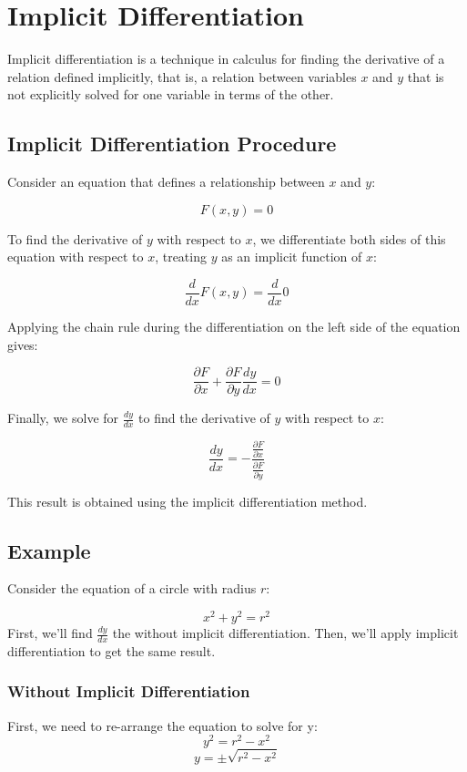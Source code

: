 \chapter{Implicit Differentiation}

Implicit differentiation is a technique in calculus for finding the
derivative of a relation defined implicitly, that is, a relation
between variables $x$ and $y$ that is not explicitly solved for one
variable in terms of the other.

\section{Implicit Differentiation Procedure}

Consider an equation that defines a relationship between $x$ and $y$:

\[
F(x, y) = 0
\]

To find the derivative of $y$ with respect to $x$, we differentiate
both sides of this equation with respect to $x$, treating $y$ as an
implicit function of $x$:

\[
\frac{d}{dx} F(x, y) = \frac{d}{dx} 0
\]

Applying the chain rule during the differentiation on the left side of
the equation gives:

\[
\frac{\partial F}{\partial x} + \frac{\partial F}{\partial y} \frac{dy}{dx} = 0
\]

Finally, we solve for $\frac{dy}{dx}$ to find the derivative of $y$
with respect to $x$:

\[
\frac{dy}{dx} = -\frac{\frac{\partial F}{\partial x}}{\frac{\partial F}{\partial y}}
\]

This result is obtained using the implicit differentiation method.

\section{Example}

Consider the equation of a circle with radius $r$:

\[
x^2 + y^2 = r^2
\]
First, we'll find $\frac{dy}{dx}$ the without implicit differentiation. Then, we'll apply implicit differentiation to get the same result. 

\subsection{Without Implicit Differentiation}
First, we need to re-arrange the equation to solve for y: $$y^2 = r^2-x^2$$
$$y=\pm \sqrt{r^2-x^2}$$

